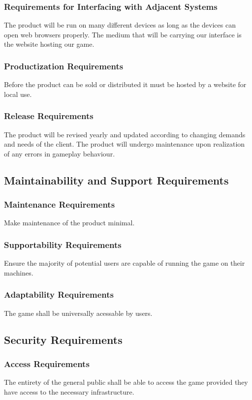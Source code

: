 \documentclass[11pt, oneside]{article}   	%
\begin{document}
\subsubsection*{Requirements for Interfacing with Adjacent Systems}
The product will be run on many different devices as long as the devices can open web browsers properly. The medium that will be carrying our interface is the website hosting our game.


\subsubsection*{Productization Requirements}
Before the product can be sold or distributed it must be hosted by a website for local use.

\subsubsection*{Release Requirements}
The product will be revised yearly and updated according to changing demands and needs of the client. The product will undergo maintenance upon realization of any errors in gameplay behaviour.


\subsection*{Maintainability and Support Requirements}
\subsubsection*{Maintenance Requirements}
Make maintenance of the product minimal.


\subsubsection*{Supportability Requirements}
Ensure the majority of potential users are capable of running the game on their machines.


\subsubsection*{Adaptability Requirements}
The game shall be universally acessable by users.


\subsection*{Security Requirements}
\subsubsection*{Access Requirements}
The entirety of the general public shall be able to access the game provided they have access to the necessary infrastructure.
\end{document}
